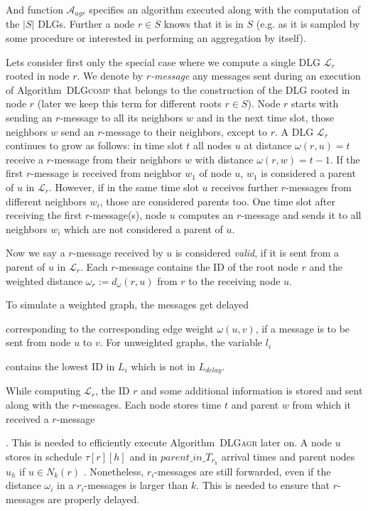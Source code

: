 \documentclass[11pt]{article}
\newcommand{\todoI}[1]{}\newcommand{\blueI}[1]{}
\newcommand{\calL}{\mathcal{L}}
\newif\iffull
\begin{document}
And function ${\mathcal{A}}_{agr}$ specifies an algorithm executed along with the computation of the $|S|$ DLGs.
Further a node $r\in S$ knows that it is in $S$ (e.g. as it is sampled by some procedure or interested in performing an aggregation by itself).
\todoI{describe basic short idea of Algo}
Lets consider first only the special case where we compute a single DLG $\calL_r$ rooted in node $r$. We denote by \emph{$r$-message} any messages sent during an execution of Algorithm\iffull~\ref{alg:DLGcomp}\fi~\textsc{DLGcomp} that belongs to the construction of the DLG rooted in node $r$ (later we keep this term for different roots $r\in S$).  Node $r$ starts with sending an $r$-message to all its neighbors $w$ and in the next time slot, those neighbors $w$ send an $r$-message to their neighbors, except to $r$.
A DLG $\calL_r$ continues to grow as follows: in time slot $t$ all nodes $u$ at distance $\omega(r,u)=t$ receive a $r$-message from their neighbors $w$ with distance $\omega(r,w)=t-1$. If the first $r$-message is received from neighbor $w_1$ of node $u$, $w_1$ is considered a parent of $u$ in $\calL_r$. However, if in the same time slot $u$ receives further $r$-messages from different neighbors $w_i$, those are considered parents too. One time slot after receiving the first $r$-message(s), node $u$ computes an $r$-message and sends it to all neighbors $w_i$ which are not considered a parent of $u$.


Now we say a $r$-message received by $u$ is considered \emph{valid}, if it is sent from a parent of $u$ in $\calL_r$. Each $r$-message contains the ID of the root node $r$ and the weighted distance $\omega_r:=d_\omega(r,u)$ from $r$ to the receiving node $u$.




To simulate a weighted graph, the messages get delayed 
\iffull in Line \ref{line:li} \fi
 corresponding to the corresponding edge weight $\omega(u,v)$, if a message is to be sent from node $u$ to $v$. For unweighted graphs, the variable $l_i$
\iffull (Line \ref{line:li}) \fi
 contains the lowest ID in $L_i$ which is not in $L_{delay}$.\todoI{details: what is $L_i$, $L_{delay}$.}

While computing $\calL_r$, the ID $r$ and some additional information is stored and sent along with the $r$-messages. Each node stores time $t$ and parent $w$ from which it received a $r$-message
\iffull
 (Line \ref{line:tau} and \ref{line:tauplusone})
\fi
. This is needed to efficiently execute Algorithm\iffull~\ref{alg:DLGagr}\fi~\textsc{DLGagr} later on. 
A node $u$ stores in schedule $\tau[r][h]$ and in $parent\_in\_T_{r_h}$ arrival times and parent nodes $u_h$ if $u\in N_k(r)$ \iffull(Lines \ref{line:kvarstart} to \ref{line:exf} are only executed if $u\in N_k(r_i)$, i.e. if $\omega_i\leq k$, where $\omega_i$ was received in a $r_i$-message)\fi.
Nonetheless, $r_i$-messages are still forwarded, even if the distance $\omega_i$ in a $r_i$-messages is larger than $k$.
This is needed to ensure that $r$-messages are properly delayed.
\end{document}
